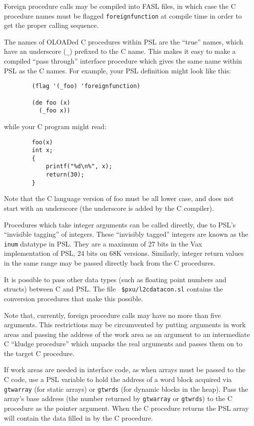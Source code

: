 Foreign procedure calls may be compiled into FASL files, in which case
the C procedure names must be flagged {\tt foreignfunction} at compile
time in order to get the proper calling sequence.

The names of OLOADed C procedures within PSL are the ``true'' names,
which have an underscore ({\tt \_}) prefixed to the C name.  This makes
it easy to make a compiled ``pass through'' interface procedure which
gives the same name within PSL as the C names.  For example, your PSL
definition might look like this:
\begin{verbatim}
        (flag '(_foo) 'foreignfunction)

        (de foo (x)
          (_foo x))
\end{verbatim}
while your C program might read:
\begin{verbatim}
        foo(x)
        int x;
        {
            printf("%d\n%", x);
            return(30);
        }
\end{verbatim}
Note that the C language version of foo must be all lower case, and
does not start with an underscore (the underscore is added by the C
compiler).

Procedures which take integer arguments can be called directly, due to
PSL's ``invisible tagging'' of integers.  These ``invisibly tagged''
integers are known as the {\tt inum} datatype in PSL.  They are a
maximum of 27 bits in the Vax implementation of PSL, 24 bits on 68K
versions.  Similarly, integer return values in the same range may be
passed directly back from the C procedures.

It is possible to pass other data types (such as floating point
numbers and structs) between C and PSL.  The file {\tt
\$pxu/l2cdatacon.sl} contains the conversion procedures that make this
possible.

Note that, currently, foreign procedure calls may have no more than
five arguments.  This restrictions may be circumvented by putting
arguments in work areas and passing the address of the work area as an
argument to an intermediate C ``kludge procedure'' which unpacks the
real arguments and passes them on to the target C procedure.

If work areas are needed in interface code, as when arrays must be
passed to the C code, use a PSL variable to hold the address of a word
block acquired via {\tt gtwarray} (for static arrays) or {\tt gtwrds}
(for dynamic blocks in the heap).  Pass the array's base address (the
number returned by {\tt gtwarray} or {\tt gtwrds}) to the C procedure
as the pointer argument.  When the C procedure returns the PSL array
will contain the data filled in by the C procedure.


